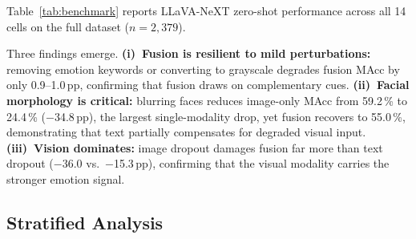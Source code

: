 Table~\ref{tab:benchmark} reports LLaVA-NeXT zero-shot performance
across all 14 cells on the full dataset ($n=2{,}379$).

\begin{table}[t]
\centering
\caption{Robustness benchmark: LLaVA-NeXT zero-shot across 6
perturbation conditions and 3 modalities.  ``---'' denotes degenerate
cells (perturbation does not affect the active modality).
$\Delta$MAcc is the change from baseline.}
\label{tab:benchmark}
\end{table}

Three findings emerge.
\textbf{(i)~Fusion is resilient to mild perturbations:}
removing emotion keywords or converting to grayscale degrades fusion MAcc
by only 0.9--1.0\,pp, confirming that fusion draws on complementary cues.
\textbf{(ii)~Facial morphology is critical:}
blurring faces reduces image-only MAcc from 59.2\,\% to 24.4\,\%
($-$34.8\,pp), the largest single-modality drop, yet fusion recovers
to 55.0\,\%, demonstrating that text partially compensates for degraded
visual input.
\textbf{(iii)~Vision dominates:}
image dropout damages fusion far more than text dropout
($-$36.0 vs.\ $-$15.3\,pp), confirming that the visual modality carries
the stronger emotion signal.



\subsection{Stratified Analysis}
\label{sec:stratified-results}

